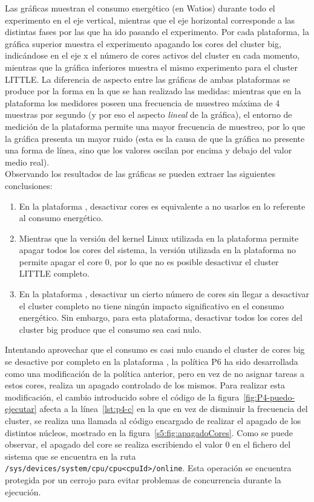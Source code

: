 Las gráficas muestran el consumo energético (en Watios) durante todo el
experimento en el eje vertical, mientras que el eje horizontal corresponde
a las distintas fases por las que ha ido pasando el experimento. Por cada
plataforma, la gráfica superior muestra el experimento apagando los cores
del cluster big, indicándose en el eje x el número de cores activos del
cluster en cada momento, mientras que la gráfica inferiores muestra el
mismo experimento para el cluster LITTLE. La diferencia de aspecto entre
las gráficas de ambas plataformas se produce por la forma en la que se han
realizado las medidas: mientras que en la plataforma \odroid los medidores
poseen una frecuencia de muestreo máxima de 4 muestras por segundo (y por
eso el aspecto \emph{lineal} de la gráfica), el entorno de medición de la
plataforma \juno permite una mayor frecuencia de muestreo, por lo que la
gráfica presenta un mayor ruido (esta es la causa de que la gráfica no
presente una forma de línea, sino que los valores oscilan por encima y
debajo del valor medio real).\\
Observando los resultados de las gráficas se pueden extraer las siguientes
conclusiones:

\begin{enumerate}
\item En la plataforma \juno, desactivar cores es equivalente a no usarlos
  en lo referente al consumo energético.
\item Mientras que la versión del kernel Linux utilizada en la plataforma
  \juno permite apagar todos los cores del sistema, la versión utilizada en
  la plataforma \odroid no permite apagar el core 0, por lo que no es
  posible desactivar el cluster LITTLE completo.
\item En la plataforma \odroid, desactivar un cierto número de cores sin
  llegar a desactivar el cluster completo no tiene ningún impacto
  significativo en el consumo energético. Sin embargo, para esta
  plataforma, desactivar todos los cores del cluster big produce que el
  consumo sea casi nulo.
\end{enumerate}


Intentando aprovechar que el consumo es casi nulo cuando el cluster de
cores big se desactive por completo en la plataforma \odroid, la política
P6 ha sido desarrollada como una modificación de la política anterior, pero
en vez de no asignar tareas a estos cores, realiza un apagado controlado de
los mismos. Para realizar esta modificación, el cambio introducido sobre el
código de la figura~\ref{fig:P4-puedo-ejecutar} afecta a la
línea~\ref{lst:p4-c} en la que en vez de disminuir la frecuencia
del cluster, se realiza una llamada al código encargado de realizar el
apagado de los distintos núcleos, mostrado en la
figura~\ref{s5:fig:apagadoCores}. Como se puede observar, el apagado del
core se realiza escribiendo el valor 0 en el fichero del sistema que se
encuentra en la ruta
\texttt{/sys/devices/system/cpu/cpu<cpuId>/online}. Esta operación se
encuentra protegida por un cerrojo para evitar problemas de concurrencia
durante la ejecución.



